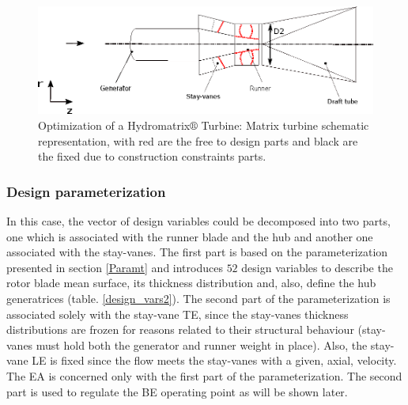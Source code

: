 \begin{figure}[h!]
\centering
\includegraphics[width=120mm]{gen_turb.eps}    
\caption{Optimization of a Hydromatrix$\circledR$ Turbine: Matrix turbine schematic representation, with red are the free to design parts and black are the fixed due to construction constraints parts.  }
\label{Matrix_b}
\end{figure}

\subsubsection{Design parameterization}
In this case, the vector of design variables could be decomposed into two parts, one which is associated with the runner blade and the hub and another one associated with the stay-vanes. The first part is based on the parameterization presented in section \ref{Paramt} and introduces $52$ design variables to describe the rotor blade mean surface, its thickness distribution and, also, define the hub generatrices (table. \ref{design_vars2}). The second part of the parameterization is associated solely with the stay-vane TE, since the stay-vanes thickness distributions are frozen for reasons related to their structural behaviour (stay-vanes must hold both the generator and runner weight in place). Also, the stay-vane LE is fixed since the flow meets the stay-vanes with a given, axial, velocity.  The EA is concerned only with the first part of the parameterization. The second part is used to regulate the BE operating point as will be shown later.      

